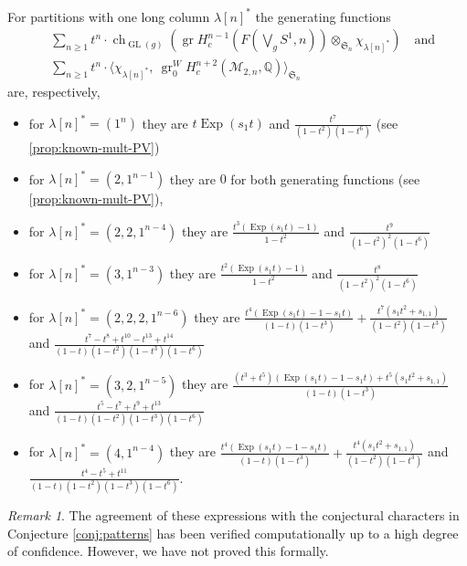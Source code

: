 \documentclass[12pt]{article}
\newcommand{\Q}{\mathbb{Q}}
\newcommand{\SymGroup}[1][n]{\mathfrak{S}_{#1}}
\newcommand{\Specht}[1]{\chi_{#1}}
\newcommand{\TransposePartition}[1]{{#1}^{\ast}}
\newcommand{\ModuliCurve}[1]{\mathcal{M}_{#1}}
\DeclareMathOperator{\GL}{GL}
\DeclareMathOperator{\gr}{gr}
\theoremstyle{plain}
\theoremstyle{definition}
\theoremstyle{remark}
\newtheorem{rmk}[thm]{Remark}
\begin{document}
For partitions with one long column $\TransposePartition{\lambda[n]}$ the generating functions
\begin{align*}
    &\sum_{n\geq 1}{t^n \cdot \operatorname{ch}_{\GL(g)}\left(\gr H_c^{n-1}(F(\bigvee_g S^1, n))\otimes_{\SymGroup}\Specht{\TransposePartition{\lambda[n]}}\right)}\quad\text{and}\\
    &\sum_{n\geq 1}{t^n\cdot\langle\Specht{\TransposePartition{\lambda[n]}},\ \gr_0^W H_c^{n+2}(\ModuliCurve{2,n},\Q)\rangle_{\SymGroup}}
\end{align*}
are, respectively,
\begin{itemize}
        \item for $\TransposePartition{\lambda[n]} = (1^n)$ they are $t\operatorname{Exp}(s_1t)$ and $\frac{t^7}{(1-t^2)(1-t^6)}$  (see \ref{prop:known-mult-PV})
        \item for $\TransposePartition{\lambda[n]} = (2,1^{n-1})$ they are $0$ for both generating functions (see \ref{prop:known-mult-PV}),
        \item for $\TransposePartition{\lambda[n]} = (2,2,1^{n-4})$ they are $\frac{t^3(\operatorname{Exp}(s_1t)-1)}{1-t^2}$ and $\frac{t^9}{(1-t^2)^2(1-t^6)}$
        \item for $\TransposePartition{\lambda[n]} = (3,1^{n-3})$ they are $\frac{t^2(\operatorname{Exp}(s_1t)-1)}{1-t^2}$ and $\frac{t^8}{(1-t^2)^2(1-t^6)}$
        \item for $\TransposePartition{\lambda[n]} = (2,2,2,1^{n-6})$ they are $\frac{t^4(\operatorname{Exp}(s_1t)-1-s_1t)}{(1-t)(1-t^3)} + \frac{t^7(s_1t^2+s_{1,1})}{(1-t^2)(1-t^3)}$ and $\frac{t^7-t^8+t^{10}-t^{13}+t^{14}}{(1-t)(1-t^2)(1-t^3)(1-t^6)}$
        \item for $\TransposePartition{\lambda[n]} = (3,2,1^{n-5})$ they are $\frac{(t^3+t^5)(\operatorname{Exp}(s_1t)-1-s_1t) + t^5(s_1t^2 + s_{1,1})}{(1-t)(1-t^3)}$ and $\frac{t^5-t^7+t^9+t^{13}}{(1-t)(1-t^2)(1-t^3)(1-t^6)}$
        \item for $\TransposePartition{\lambda[n]} = (4,1^{n-4})$ they are $\frac{t^4(\operatorname{Exp}(s_1t)-1-s_1t)}{(1-t)(1-t^3)} + \frac{t^4(s_1t^2+s_{1,1})}{(1-t^2)(1-t^3)}$ and $\frac{t^4-t^5+t^{11}}{(1-t)(1-t^2)(1-t^3)(1-t^6)}$.
    \end{itemize}

\begin{rmk}
    The agreement of these expressions with the conjectural characters in Conjecture \ref{conj:patterns} has been verified computationally up to a high degree of confidence. However, we have not proved this formally. 
\end{rmk}

%
%
\printbibliography
\end{document}
